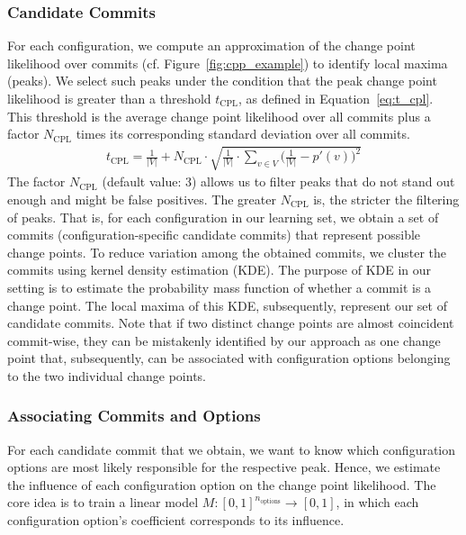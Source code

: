 \documentclass[sigconf]{acmart}
\begin{document}
	\subsubsection{Candidate Commits}
	For each configuration, we compute an approximation of the change point likelihood over commits (cf. Figure~\ref{fig:cpp_example}) to identify local maxima (peaks). We select such peaks under the condition that the peak change point likelihood is greater than a  threshold $t_\text{CPL}$, as defined in Equation~\ref{eq:t_cpl}. This threshold is the average change point likelihood over all commits plus a factor $N_\text{CPL}$ times its corresponding standard deviation over all commits. 
	\begin{equation}
	\begin{gathered}
	t_\text{CPL} = \frac{1}{\vert V\vert} + N_\text{CPL} \cdot \sqrt{\frac{1}{\vert V\vert} \cdot \sum_{v \in V} \Big(\frac{1}{\vert V\vert} - p'(v)\Big)^2}
	\label{eq:t_cpl}
	\end{gathered}
	\end{equation}
	The factor $N_\text{CPL}$ (default value: 3) allows us to filter peaks that do not stand out enough and might be false positives. The greater $N_\text{CPL}$ is, the stricter the filtering of peaks. That is, for each configuration in our learning set, we obtain a set of commits (configuration-specific candidate commits) that represent possible change points.
	To reduce variation among the obtained commits, we cluster the commits using kernel density estimation (KDE). The purpose of KDE in our setting is to estimate the probability mass function of whether a commit is a change point. The local maxima of this KDE, subsequently, represent our set of candidate commits. {\color{red}Note that if two distinct change points are almost coincident commit-wise, they can be mistakenly identified by our approach as one change point that, subsequently, can be associated with configuration options belonging to the two individual change points. }
	
	\subsubsection{Associating Commits and Options}
	For each candidate commit that we obtain, we want to know which configuration options are most likely responsible for the respective peak. Hence, we estimate the influence  of each configuration option on the change point likelihood. The core idea is to train a linear model $M: [0,1]^{n_{\text{options}}} \rightarrow [0,1]$, in which each configuration option's coefficient corresponds to its influence. 
	
\end{document}
